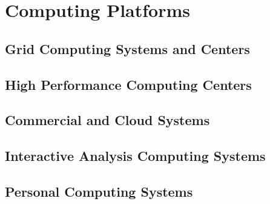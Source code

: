 %
\chapter{Computing Platforms} 
\section{Grid Computing Systems and Centers}
\section{High Performance Computing Centers}
\section{Commercial and Cloud Systems}
\section{Interactive Analysis Computing Systems}
\section{Personal Computing Systems}